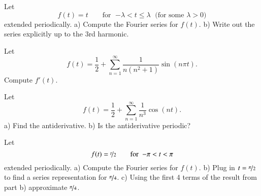 \begin{exercise}
Let
\begin{equation*}
f(t) = t \qquad \text{for } \; {-\lambda} < t \leq \lambda \; \text{ (for
some } \lambda > 0 \text{)}
\end{equation*}
extended periodically. a) Compute the Fourier series for $f(t)$. b) Write out the series explicitly up to
the 3rd harmonic.
\end{exercise}

\begin{exercise}
Let
\begin{equation*}
f(t) = \frac{1}{2} + \sum_{n=1}^\infty
\frac{1}{n(n^2+1)}
\sin(n\pi t) .
\end{equation*}
Compute $f'(t)$.
\end{exercise}

\begin{exercise}
Let
\begin{equation*}
f(t) = \frac{1}{2} + \sum_{n=1}^\infty
\frac{1}{n^3}
\cos(n t) .
\end{equation*}
a) Find the antiderivative.
b) Is the antiderivative periodic?
\end{exercise}

\begin{exercise}
Let
\begin{equation*}
f(t) = \nicefrac{t}{2} \qquad \text{for } \; {-\pi} < t < \pi
\end{equation*}
extended periodically.
a) Compute the Fourier series for $f(t)$.
b) Plug in $t=\nicefrac{\pi}{2}$ to find a series representation
for $\nicefrac{\pi}{4}$. c) Using the first 4 terms of the result from part b)
approximate $\nicefrac{\pi}{4}$.
\end{exercise}


